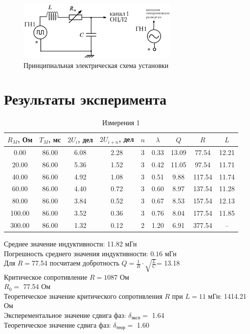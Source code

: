 \documentclass{article}%
\begin{document}
\begin{figure}[h!]%
\centering%
\includegraphics[width=300px]{lab_3_10_p1.png}%
\caption{Принципиальная электрическая схема установки}%
\end{figure}

%
\section{Результаты эксперимента}%
\label{sec:}%


\begin{table}[h!]%
\centering%
\begin{tabular}{|c|c|c|c|c|c|c|c|c|}%
\hline%
$R_M$, Ом&$T_M$, мс&$2 U_i$, дел&$2 U_{i+n}$, дел&$n$&$\lambda$&$Q$&$R$&$L$\\%
\hline%
0.00&86.00&6.08&2.28&3&0.33&13.09&77.54&12.21\\%
\hline%
20.00&86.00&5.36&1.52&3&0.42&11.05&97.54&11.71\\%
\hline%
40.00&86.00&4.92&1.08&3&0.51&9.88&117.54&11.74\\%
\hline%
60.00&86.00&4.40&0.72&3&0.60&8.97&137.54&11.28\\%
\hline%
80.00&86.00&3.84&0.52&3&0.67&8.53&157.54&12.13\\%
\hline%
100.00&86.00&3.52&0.36&3&0.76&8.04&177.54&11.85\\%
\hline%
300.00&86.00&1.32&0.12&2&1.20&6.91&377.54& – \\%
\hline%
\end{tabular}%
\caption{Измерения 1}%
\end{table}

%
Среднее значение индуктивности: 11.82 мГн\\%
Погрешность среднего значения индуктивности: $0.16$ мГн\\%
Для $R = $77.54 посчитаем добротность $Q = \frac{1}{R} \cdot \sqrt{\frac{L}{C}}$= 13.18 \\%
Критическое сопротивление $R = 1087$ Ом \\%
$R_0 = $ 77.54 Ом \\%
Теоретическое значение критического сопротивления $R$ при $L = 11$ мГн: 1414.21 Ом\\%
Эксперементальное значение сдвига фаз: $\delta_{\text{эксп}} = $ 1.64\\%
Теоретическое значение сдвига фаз: $\delta_{\text{теор}} = $ 1.60\\%
\end{document}
